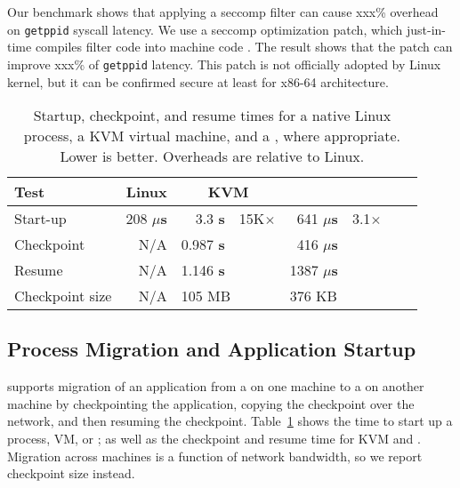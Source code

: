 \vspace{5pt}
Our benchmark shows that applying a seccomp filter can cause xxx\% overhead on {\tt getppid} syscall latency. We use a seccomp optimization patch, which just-in-time compiles filter code into machine code .
The result shows that the patch can improve xxx\% of {\tt getppid} latency.
This patch is not officially adopted by Linux kernel, but it can be confirmed secure at least for x86-64 architecture.


\begin{table}[t!b!]
\footnotesize
\centering
\begin{tabular}{|l|r|rr|rr|rr|}
\hline
{\bf Test } & {\bf Linux } & \multicolumn{2}{|c|}{{\bf KVM}}
& \multicolumn{2}{|c|}{{\bf \sysname{}}}\\
\hline

Start-up & 208 {\bf $\mu$s} & 3.3 {\bf s} & 15K$\times$ & 641 {\bf $\mu$s} & 3.1$\times$ \\
\hline
Checkpoint & N/A & 0.987 {\bf s} &  & 416  {\bf $\mu$s} & \\
\hline
Resume & N/A & 1.146 {\bf s}  &  &  1387 {\bf $\mu$s} &  \\
\hline\hline
Checkpoint size & N/A & \multicolumn{2}{|l|}{105 MB} & \multicolumn{2}{|l|}{376 KB}   \\
\hline
\end{tabular}
\caption[\sysname{}: startup, checkpoint, and resume times.]
{Startup, checkpoint, and resume times for a native Linux process,
a KVM virtual machine,
and a \sysname{} \picoproc{}, where appropriate. Lower is better.  
Overheads are relative to Linux.} 
\label{tab:graphene:startup}
\end{table}

\subsection{Process Migration and Application Startup}

\sysname{} supports migration of an application from a \picoproc{} on one machine
to a \picoproc{} on another machine by checkpointing the application,
copying the checkpoint over the network, and then resuming the checkpoint.
Table~\ref{tab:graphene:startup} shows the time to start
up a process, VM, or \picoproc{}; as well as the checkpoint and resume time for KVM and \sysname{}.
Migration across machines is a function of network bandwidth,
so we report checkpoint size instead. %


